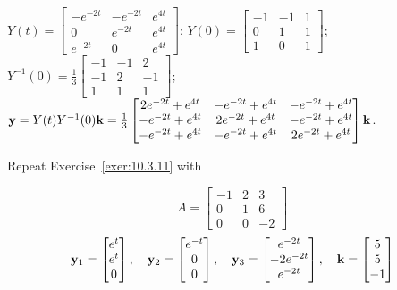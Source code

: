 \documentclass{ximera}
\begin{document}
\begin{problem}
\begin{solution}
$Y(t)=
\begin{bmatrix}-e^{-2t}&-e^{-2t}&e^{4t}\\
0&e^{-2t}&e^{4t}\\e^{-2t}&0&e^{4t}\end{bmatrix}$;
$Y(0)=
\begin{bmatrix}-1&-1&1\\0&1&1\\1&0&1\end{bmatrix}$;
$Y^{-1}(0)=
\frac{1}{3}\begin{bmatrix}-1&-1&2\\-1&2&-1
\\1&1&1\end{bmatrix}$;
${\bf y}=Y(t)Y^{-1}(0){\bf k}=
\frac{1}{3}\begin{bmatrix}2e^{-2t}+e^{4t}&-e^{-2t}+e^{4t}
&-e^{-2t}+e^{4t}
\\-e^{-2t}+e^{4t}&2e^{-2t}+e^{4t}&-e^{-2t}+e^{4t}\\
-e^{-2t}+e^{4t}&-e^{-2t}+e^{4t}&2e^{-2t}+e^{4t}
\end{bmatrix}{\bf k}$.

\end{solution}
\end{problem}

\begin{problem}\label{exer:10.3.13}
 Repeat Exercise~\ref{exer:10.3.11}  with

$$ A=\begin{bmatrix} -1 & 2 & 3 \\ 0 & 1 & 6\\
0 & 0 & -2\end{bmatrix}$$
$${\bf y}_1=\begin{bmatrix} e^t \\ e^t \\ 0\end{bmatrix},
\quad
{\bf y}_2=\begin{bmatrix} e^{-t} \\ 0 \\ 0\end{bmatrix},
\quad {\bf y}_3=\begin{bmatrix} e^{-2t} \\-2e^{-2t}
\\ e^{-2t}\end{bmatrix}, \quad
{\bf k}=\begin{bmatrix} 5 \\ 5 \\-1
\end{bmatrix}$$

\end{problem}
\end{document}

